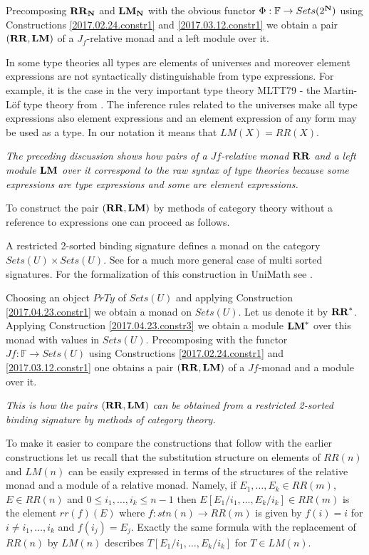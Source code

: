 \documentclass[12pt]{amsart}
\newcommand{\sr}{\rightarrow}
\newcommand{\nn}{{\bf N\rm}}
\newcommand{\nat}{\nn}
\newcommand{\RR}{{\bf RR}}
\newcommand{\LM}{{\bf LM}}
\newcommand{\FF}{{\mathbb F}}
\begin{document}
Precomposing $\RR_{\nat}$ and $\LM_{\nat}$ with the obvious functor $\Phi:\FF\sr Sets(2^{\nat})$ using Constructions \ref{2017.02.24.constr1}  and \ref{2017.03.12.constr1} we obtain a pair $(\RR,\LM)$ of a $J_f$-relative monad and a left module over it. 

In some type theories all types are elements of universes and moreover element expressions are not syntactically distinguishable from type expressions. For example, it is the case in the very important type theory MLTT79 - the Martin-L\"{o}f type theory from \cite{MLTT79}. The inference rules related to the universes \cite[p.172]{MLTT79} make all type expressions also element expressions and an element expression of any form may be used as a type. In our notation it means that $LM(X)=RR(X)$.

{\em The preceding discussion shows how pairs of a $Jf$-relative monad $\RR$ and a left module $\LM$ over it correspond to the raw syntax of type theories because some expressions are type expressions and some are element expressions.}

To construct the pair $(\RR,\LM)$ by methods of category theory without a reference to expressions one can proceed as follows.

A restricted 2-sorted binding signature defines a monad on the category $Sets(U)\times Sets(U)$. See \cite{Zsido} for a much more general case of multi sorted signatures. For the formalization of this construction in UniMath see \cite{AMM2017}. 

Choosing an object $PrTy$ of $Sets(U)$ and applying Construction \ref{2017.04.23.constr1} we obtain a monad on $Sets(U)$. Let us denote it by $\RR^*$. Applying Construction \ref{2017.04.23.constr3} we obtain a module $\LM^*$ over this monad with values in $Sets(U)$.  Precomposing with the functor $Jf:\FF\sr Sets(U)$ using Constructions \ref{2017.02.24.constr1}  and \ref{2017.03.12.constr1} one obtains a pair $(\RR,\LM)$ of a $Jf$-monad and a module over it.

{\em This is how the pairs $(\RR,\LM)$ can be obtained from a restricted 2-sorted binding signature by methods of category theory.}

To make it easier to compare the constructions that follow with the earlier constructions let us recall that the substitution structure on elements of $RR(n)$ and $LM(n)$ can be easily expressed in terms of the structures of the relative monad and a module of a relative monad. Namely, if $E_1,\dots,E_k\in RR(m)$, $E\in RR(n)$ and $0\le i_1,\dots,i_k\le n-1$ then $E[E_1/i_1,\dots,E_k/i_k]\in RR(m)$ is the element $rr(f)(E)$ where $f:stn(n)\sr RR(m)$ is given by $f(i)=i$ for $i\ne i_1,\dots,i_k$ and $f(i_j)=E_j$. Exactly the same formula with the replacement of $RR(n)$ by $LM(n)$ describes $T[E_1/i_1,\dots,E_k/i_k]$ for $T\in LM(n)$. 
\end{document}
